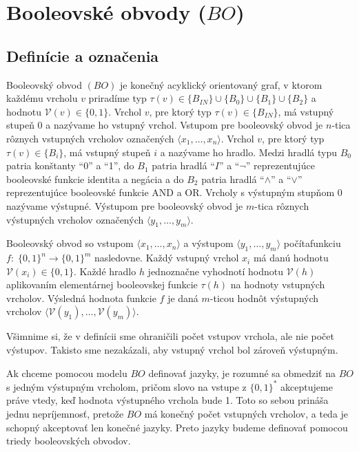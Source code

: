 \chapter{Booleovské obvody ($BO$)}

\section{Definície a označenia}

\begin{definicia}
  Booleovský obvod $(BO)$ je konečný acyklický orientovaný graf, v
  ktorom každému vrcholu $v$ priradíme typ $\tau (v)\in \{
  B_{IN}\}\cup\{ B_0\}\cup\{ B_1\}\cup\{ B_2\}$ a hodnotu
  $\mathcal{V}(v)\in\{ 0,1\}$. Vrchol $v$, pre ktorý typ $\tau
  (v)\in\{ B_{IN}\}$, má vstupný stupeň 0 a nazývame ho vstupný
  vrchol. Vstupom pre booleovský obvod je $n$-tica rôznych vstupných
  vrcholov označených $\langle x_1,\dots ,x_n\rangle$. Vrchol $v$,
  pre ktorý typ $\tau (v)\in\{ B_i\}$, má vstupný stupeň $i$ a
  nazývame ho hradlo. Medzi hradlá typu $B_0$ patria konštanty ``0''
  a ``1'', do $B_1$ patria hradlá ``$I$'' a ``$\neg$''
  reprezentujúce booleovské funkcie identita a negácia a do $B_2$
  patria hradlá ``$\wedge$'' a ``$\vee$'' reprezentujúce booleovské
  funkcie AND a OR. Vrcholy s výstupným stupňom 0 nazývame výstupné.
  Výstupom pre booleovský obvod je $m$-tica rôznych výstupných
  vrcholov označených $\langle y_1,\dots ,y_m\rangle$.
\end{definicia}

\begin{definicia}
  Booleovský obvod so vstupom $\langle x_1,\dots ,x_n\rangle$ a
  výstupom $\langle y_1,\dots ,y_m\rangle$ počíta\linebreak funkciu
  $f:\;\{ 0,1\}^n\rightarrow \{ 0,1\}^m$ nasledovne. Každý vstupný
  vrchol $x_i$ má danú hodnotu\linebreak $\mathcal{V}(x_i)\in\{
  0,1\}$. Každé hradlo $h$ jednoznačne vyhodnotí hodnotu
  $\mathcal{V}(h)$ aplikovaním elementárnej booleovskej funkcie
  $\tau (h)$ na hodnoty vstupných vrcholov. Výsledná hodnota funkcie
  $f$ je daná $m$-ticou hodnôt výstupných vrcholov $\langle
  \mathcal{V}(y_1),\dots ,\mathcal{V}(y_m)\rangle$.
\end{definicia}

Všimnime si, že v definícii sme ohraničili počet vstupov vrchola,
ale nie počet výstupov. Takisto sme nezakázali, aby vstupný vrchol
bol zároveň výstupným.

Ak chceme pomocou modelu $BO$ definovať jazyky, je rozumné sa
obmedziť na $BO$ s jedným výstupným vrcholom, pričom slovo na
vstupe z $\{ 0,1\}^*$ akceptujeme práve vtedy, keď hodnota
výstupného vrchola bude 1. Toto so sebou prináša jednu
nepríjemnosť, pretože $BO$ má konečný počet vstupných vrcholov, a
teda je schopný akceptovať len konečné jazyky. Preto jazyky budeme
definovať pomocou triedy booleovských obvodov.

